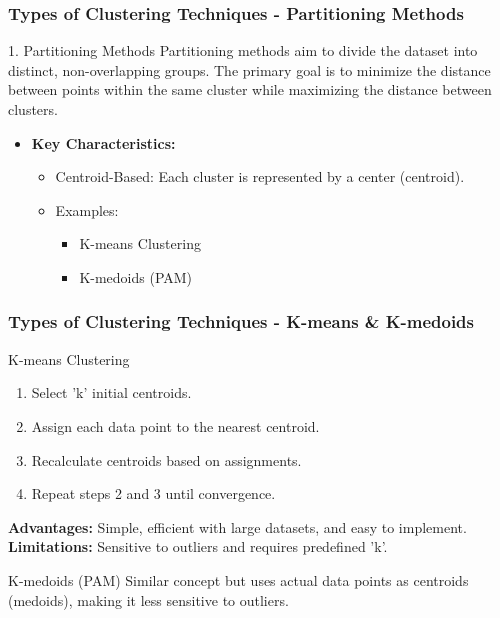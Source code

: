 \documentclass[aspectratio=169]{beamer}
\begin{document}
\begin{frame}[fragile]
    \frametitle{Types of Clustering Techniques - Partitioning Methods}
    \begin{block}{1. Partitioning Methods}
    Partitioning methods aim to divide the dataset into distinct, non-overlapping groups. The primary goal is to minimize the distance between points within the same cluster while maximizing the distance between clusters.
    \end{block}
    
    \begin{itemize}
        \item \textbf{Key Characteristics:}
        \begin{itemize}
            \item Centroid-Based: Each cluster is represented by a center (centroid).
            \item Examples: 
            \begin{itemize}
                \item K-means Clustering
                \item K-medoids (PAM)
            \end{itemize}
        \end{itemize}
    \end{itemize}
\end{frame}

\begin{frame}[fragile]
    \frametitle{Types of Clustering Techniques - K-means & K-medoids}
    \begin{block}{K-means Clustering}
        \begin{enumerate}
            \item Select 'k' initial centroids.
            \item Assign each data point to the nearest centroid.
            \item Recalculate centroids based on assignments.
            \item Repeat steps 2 and 3 until convergence.
        \end{enumerate}
        \textbf{Advantages:} Simple, efficient with large datasets, and easy to implement.\\
        \textbf{Limitations:} Sensitive to outliers and requires predefined 'k'.
    \end{block}

    \begin{block}{K-medoids (PAM)}
        Similar concept but uses actual data points as centroids (medoids), making it less sensitive to outliers.
    \end{block}
\end{frame}
\end{document}
